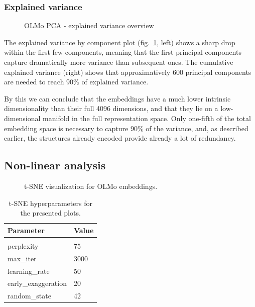 \documentclass[
  a4paper, twoside, 10pt, titlepage]{book}
\makeatletter
\newcommand*\pandocbounded[1]{%
  \sbox\pandoc@box{#1}%
  \Gscale@div\@tempa{\textheight}{\dimexpr\ht\pandoc@box+\dp\pandoc@box\relax}%
  \Gscale@div\@tempb{\linewidth}{\wd\pandoc@box}%
  \ifdim\@tempb\p@<\@tempa\p@\let\@tempa\@tempb\fi%
  \ifdim\@tempa\p@<\p@\scalebox{\@tempa}{\usebox\pandoc@box}%
  \else\usebox{\pandoc@box}%
  \fi%
}
\makeatother
\begin{document}
\subsubsection{Explained variance}\label{explained-variance}

\begin{figure}
\centering
\pandocbounded{}
\caption{OLMo PCA - explained variance
overview}\label{fig:olmo-variance}
\end{figure}

The explained variance by component plot (fig.~\ref{fig:olmo-variance},
left) shows a sharp drop within the first few components, meaning that
the first principal components capture dramatically more variance than
subsequent ones. The cumulative explained variance (right) shows that
approximatively 600 principal components are needed to reach 90\% of
explained variance.

By this we can conclude that the embeddings have a much lower intrinsic
dimensionality than their full 4096 dimensions, and that they lie on a
low-dimensional manifold in the full representation space. Only
one-fifth of the total embedding space is necessary to capture 90\% of
the variance, and, as described earlier, the structures already encoded
provide already a lot of redundancy.

\subsection{Non-linear analysis}\label{non-linear-analysis}

\begin{figure}
\centering
\pandocbounded{}
\caption{t-SNE visualization for OLMo embeddings.}\label{fig:olmo-tsne}
\end{figure}

\begin{longtable}[]{@{}ll@{}}
\toprule\noalign{}
\textbf{Parameter} & \textbf{Value} \\
\midrule\noalign{}
\endhead
\bottomrule\noalign{}
\tabularnewline
\caption{\label{tbl:tsne-params}t-SNE hyperparameters for the presented
plots.}
\endlastfoot
perplexity & 75 \\
max\_iter & 3000 \\
learning\_rate & 50 \\
early\_exaggeration & 20 \\
random\_state & 42 \\
\end{longtable}
\end{document}
